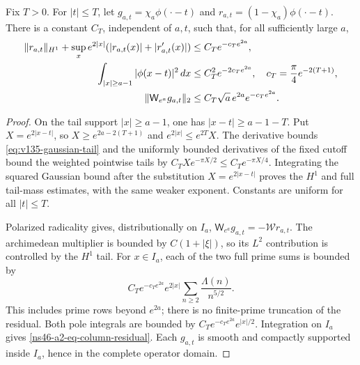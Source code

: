 \begin{lemma}
\label{ns46-a2-lem-fixed-centers}
Fix $T>0$. For $|t|\le T$, let
$g_{a,t}=\chi_a\phi(\cdot-t)$ and
$r_{a,t}=(1-\chi_a)\phi(\cdot-t)$. There is a constant $C_T$,
independent of $a,t$, such that, for all sufficiently large $a$,
\begin{align}
 \|r_{a,t}\|_{H^1}
  +\sup_x e^{2|x|}(|r_{a,t}(x)|+|r'_{a,t}(x)|)
 &\le C_Te^{-c_Te^{2a}},\notag\\
 \int_{|x|\ge a-1}|\phi(x-t)|^2\,dx
 &\le C_T^2e^{-2c_Te^{2a}},
 \quad c_T=\frac\pi4e^{-2(T+1)},
 \label{ns46-a2-eq-tails}\\
 \|\mathsf W_{e^a}g_{a,t}\|_2
 &\le C_T\sqrt a\,e^{2a}e^{-c_Te^{2a}}.
 \label{ns46-a2-eq-column-residual}
\end{align}
\end{lemma}
\begin{proof}
On the tail support $|x|\ge a-1$, one has
$|x-t|\ge a-1-T$. Put $X=e^{2|x-t|}$, so
$X\ge e^{2a-2(T+1)}$ and $e^{2|x|}\le e^{2T}X$.
The derivative bounds \eqref{eq:v135-gaussian-tail} and the uniformly
bounded derivatives of the fixed cutoff bound the weighted pointwise
tails by $C_TXe^{-\pi X/2}\le C_Te^{-\pi X/4}$.
Integrating the squared Gaussian bound after the substitution
$X=e^{2|x-t|}$ proves the $H^1$ and full tail-mass estimates, with
the same weaker exponent. Constants are uniform for all $|t|\le T$.

Polarized radicality gives, distributionally on $I_a$,
$\mathsf W_{e^a}g_{a,t}=-\mathcal W r_{a,t}$.
The archimedean multiplier is bounded by $C(1+|\xi|)$, so its
$L^2$ contribution is controlled by the $H^1$ tail. For $x\in I_a$,
each of the two full prime sums is bounded by
\[
 C_Te^{-c_Te^{2a}}e^{2|x|}
         \sum_{n\ge2}\frac{\Lambda(n)}{n^{5/2}}.
\]
This includes prime rows beyond $e^{2a}$; there is no finite-prime
truncation of the residual. Both pole integrals are bounded by
$C_Te^{-c_Te^{2a}}e^{|x|/2}$. Integration on $I_a$ gives
\eqref{ns46-a2-eq-column-residual}. Each $g_{a,t}$ is smooth and
compactly supported inside $I_a$, hence in the complete operator domain.
\end{proof}

